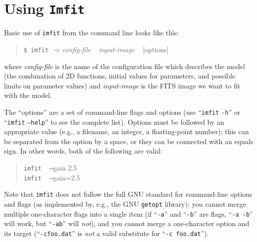 \documentclass[10pt]{article}
\newcommand{\imfit}{\texttt{imfit}}
\newcommand{\Imfit}{\texttt{Imfit}}
\begin{document}
\section{Using \Imfit{}}

Basic use of \imfit{} from the command line looks like this:
\begin{quote}
  \texttt{\$ \imfit{} }  -c \textit{config-file} ~ \textit{input-image} ~ [options]
\end{quote}
where \textit{config-file} is the name of the configuration file
which describes the model (the combination of 2D functions, initial values
for parameters, and possible limits on parameter values) and \textit{input-image}
is the FITS image we want to fit with the model.

The ``options'' are a set of command-line flags and options (use ``\imfit{} \texttt{-h}''
or ``\imfit{} \texttt{--help}'' to see the complete list). Options must be followed by
an appropriate value (e.g., a filename, an integer, a floating-point number); this can
be separated from the option by a space, or they can be connected with an equals sign.
In other words, both of the following are valid:
\begin{quote}
\imfit{} ~ \texttt{--}gain 2.5 \\
\imfit{} ~ \texttt{--}gain=2.5
\end{quote}
Note that \imfit{} does not follow the full GNU standard for
command-line options and flags (as implemented by, e.g., the GNU
\texttt{getopt} library): you cannot merge multiple one-character flags
into a single item (if ``\texttt{-a}'' and ``\texttt{-b}'' are flags,
``\texttt{-a -b}'' will work, but ``\texttt{-ab}'' will \textit{not}), and you
cannot merge a one-character option and its target
(``\texttt{-cfoo.dat}'' is \textit{not} a valid substitute for
``\texttt{-c foo.dat}'').

\bigskip
\end{document}
